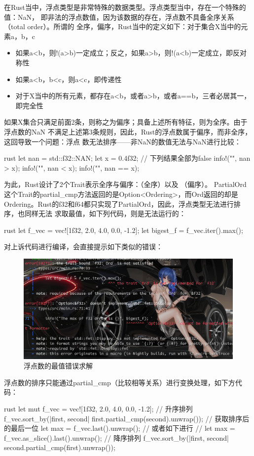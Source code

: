 在Rust当中，浮点类型是非常特殊的数据类型。浮点类型当中，存在一个特殊的值：NaN，
即非法的浮点数值，因为该数据的存在，浮点数不具备全序关系（total order）。所谓的
全序，偏序，Rust当中的定义如下：对于集合X当中的元素a，b，c
\begin{itemize}
  \item 如果a<b，则!(a>b)一定成立；反之，如果a>b，则!(a<b)一定成立，即反对称性
  \item 如果a<b，b<c，则a<c，即传递性
  \item 对于X当中的所有元素，都存在a<b，或者a>b，或者a==b，三者必居其一，即完全性
\end{itemize}
如果X集合只满足前面2条，则称之为偏序；具备上述所有特征，则为全序。由于浮点数的NaN
不满足上述第3条规则，因此，Rust的浮点数属于偏序，而非全序，这回导致一个问题：浮点
数无法排序——非NaN的数值无法与NaN进行比较：
\begin{code-block}{rust}
let nan = std::f32::NAN;
let x = 0.4f32;
// 下列结果全部为false
info!("{}", nan > x);
info!("{}", nan < x);
info!("{}", nan == x);
\end{code-block}
为此，Rust设计了2个Trait表示全序与偏序：（全序）以及
（偏序）。
PartialOrd这个Trait的partial\_cmp方法返回的是Option<Ordering>，而Ord返回的却是
Ordering。Rust的f32和f64都只实现了PartialOrd，因此，浮点类型无法进行排序，也同样无法
求取最值，如下列代码，则是无法运行的：
\begin{code-block}{rust}
let f_vec = vec![1f32, 2.0, 4.0, 0.0, -1.2];
let bigest_f = f_vec.iter().max();
\end{code-block}
对上诉代码进行编译，会直接提示如下类似的错误：
\begin{figure}[H]
  \centering
  \includegraphics[width=\linewidth]{rust_float_cmp_error.png}
  \caption{浮点数的最值错误求解}
  \label{fig:rust_float_cmp_error}
\end{figure}
浮点数的排序只能通过partial\_cmp（比较相等关系）进行变换处理，如下方代码：
\label{float_sort}
\begin{code-block}{rust}
let mut f_vec = vec![1f32, 2.0, 4.0, 0.0, -1.2];
// 升序排列
f_vec.sort_by(|first, second| first.partial_cmp(second).unwrap());
// 获取排序后的最后一位
let max = f_vec.last().unwrap();
// 或者如下进行
// let max = f_vec.as_slice().last().unwrap();
// 降序排列
f_vec.sort_by(|first, second| second.partial_cmp(first).unwrap());
\end{code-block}


